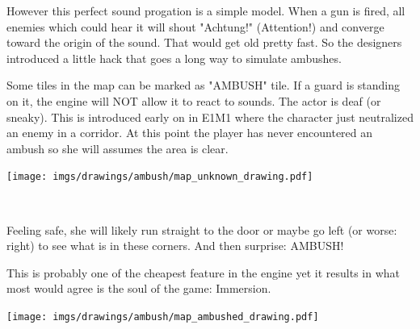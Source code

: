 However this perfect sound progation is a simple model. When a gun is fired, all enemies which could hear it will shout "Achtung!" (Attention!) and converge toward the origin of the sound. That would get old pretty fast. So the designers introduced a little hack that goes a long way to simulate ambushes.


\par
\begin{minipage}{1\textwidth}
\begin{figure}[H]
 \centering
\end{figure}
\par


  \begin{minipage}{0.6\textwidth}
  Some tiles in the map can be marked as "AMBUSH" tile. If a guard is standing on it, the engine will NOT allow it to react to sounds. The actor is deaf (or sneaky). This is introduced early on in E1M1 where the character just neutralized an enemy in a corridor. At this point the player has never encountered an ambush so she will assumes the area is clear.\\
  \end{minipage}
  \begin{minipage}{0.4\textwidth}
  \begin{flushright}
  \texttt{[image: imgs/drawings/ambush/map\_unknown\_drawing.pdf]}
  \end{flushright}  
  \end{minipage}
\end{minipage}
\noindent
\\


\par
\begin{minipage}{1\textwidth}
  \begin{figure}[H]
   \centering
  \end{figure}
  \par
  \begin{minipage}{0.6\textwidth}
  Feeling safe, she will likely run straight to the door or maybe go left (or worse: right) to see what is in these corners. And then surprise: AMBUSH!\\
  \par
   This is probably one of the cheapest feature in the engine yet it results in what most would agree is the soul of the game: Immersion.
  \end{minipage}
  \begin{minipage}{0.4\textwidth}
  \begin{flushright}
  \texttt{[image: imgs/drawings/ambush/map\_ambushed\_drawing.pdf]}
  \end{flushright}
  \end{minipage}
\end{minipage}
\noindent
\\



